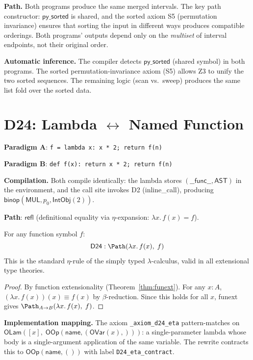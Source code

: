 \textbf{Path.}
Both programs produce the same merged intervals.  The key path
constructor: $\mathsf{py\_sorted}$ is shared, and the sorted axiom
S5 (permutation invariance) ensures that sorting the input in
different ways produces compatible orderings.  Both programs' outputs
depend only on the \emph{multiset} of interval endpoints, not their
original order.

\textbf{Automatic inference.}
The compiler detects $\mathsf{py\_sorted}$ (shared symbol) in both
programs.  The sorted permutation-invariance axiom (S5) allows Z3
to unify the two sorted sequences.  The remaining logic (scan vs.\
sweep) produces the same list fold over the sorted data.

\section{D24: Lambda $\leftrightarrow$ Named Function}
\label{sec:d24-eta}

\textbf{Paradigm A}: \texttt{f = lambda x: x * 2; return f(n)}

\textbf{Paradigm B}: \texttt{def f(x): return x * 2; return f(n)}

\textbf{Compilation.}
Both compile identically: the lambda stores
$(\mathsf{\_\_func\_\_}, \mathsf{AST})$ in the environment, and the
call site invokes D2 (inline\_call), producing
$\mathsf{binop}(\mathsf{MUL}, p_0, \mathsf{IntObj}(2))$.

\textbf{Path}: $\mathsf{refl}$ (definitional equality via
$\eta$-expansion: $\lambda x.\, f(x) = f$).

\begin{theorem}
\label{thm:d24-eta}
For any function symbol $f$:
\[
  \mathsf{D24} : \Path\!\left(
    \lambda x.\, f(x),\; f
  \right)
\]
This is the standard $\eta$-rule of the simply typed
$\lambda$-calculus, valid in all extensional type theories.
\end{theorem}

\begin{proof}
By function extensionality (Theorem~\ref{thm:funext}).  For any
$x : A$, $(\lambda x.\, f(x))(x) \equiv f(x)$ by $\beta$-reduction.
Since this holds for all $x$, funext gives
$\Path_{A \to B}(\lambda x.\, f(x),\; f)$.
\end{proof}

\textbf{Implementation mapping.}
The axiom \texttt{\_axiom\_d24\_eta} pattern-matches on
$\mathsf{OLam}([x],\; \mathsf{OOp}(\mathsf{name},
(\mathsf{OVar}(x),)))$: a single-parameter lambda whose body is a
single-argument application of the same variable.  The rewrite
contracts this to $\mathsf{OOp}(\mathsf{name}, ())$ with label
\texttt{D24\_eta\_contract}.


